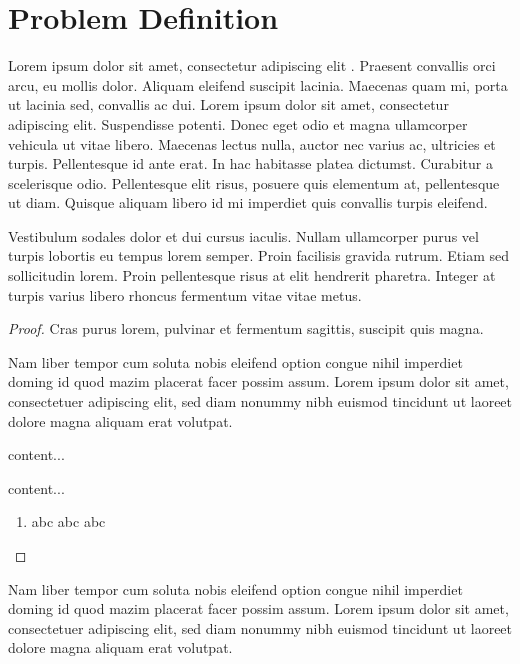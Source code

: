 \documentclass[
  a4paper,
  oneside,         %
  UKenglish,       %
  cleveref,        %
  autoref,         %
  thm-restate      %
]{lipics-v2021}
\begin{document}
\section{Problem Definition}

Lorem ipsum dolor sit amet, consectetur adipiscing elit \cite{DBLP:journals/cacm/Knuth74}. Praesent convallis orci arcu, eu mollis dolor. Aliquam eleifend suscipit lacinia. Maecenas quam mi, porta ut lacinia sed, convallis ac dui. Lorem ipsum dolor sit amet, consectetur adipiscing elit. Suspendisse potenti. Donec eget odio et magna ullamcorper vehicula ut vitae libero. Maecenas lectus nulla, auctor nec varius ac, ultricies et turpis. Pellentesque id ante erat. In hac habitasse platea dictumst. Curabitur a scelerisque odio. Pellentesque elit risus, posuere quis elementum at, pellentesque ut diam. Quisque aliquam libero id mi imperdiet quis convallis turpis eleifend. 

\begin{lemma}
\label{lemma:lorem}
Vestibulum sodales dolor et dui cursus iaculis. Nullam ullamcorper purus vel turpis lobortis eu tempus lorem semper. Proin facilisis gravida rutrum. Etiam sed sollicitudin lorem. Proin pellentesque risus at elit hendrerit pharetra. Integer at turpis varius libero rhoncus fermentum vitae vitae metus.
\end{lemma}

\begin{proof}
Cras purus lorem, pulvinar et fermentum sagittis, suscipit quis magna.


Nam liber tempor cum soluta nobis eleifend option congue nihil imperdiet doming id quod mazim placerat facer possim assum. Lorem ipsum dolor sit amet, consectetuer adipiscing elit, sed diam nonummy nibh euismod tincidunt ut laoreet dolore magna aliquam erat volutpat.
\begin{claim}
content...
\end{claim}
\begin{claimproof}
content...
    \begin{enumerate}
        \item abc abc abc \claimqedhere{}
    \end{enumerate}
\end{claimproof}

\end{proof}

\begin{corollary}
\label{lemma:curabitur}
Nam liber tempor cum soluta nobis eleifend option congue nihil imperdiet doming id quod mazim placerat facer possim assum. Lorem ipsum dolor sit amet, consectetuer adipiscing elit, sed diam nonummy nibh euismod tincidunt ut laoreet dolore magna aliquam erat volutpat.
\end{corollary}
\end{document}
